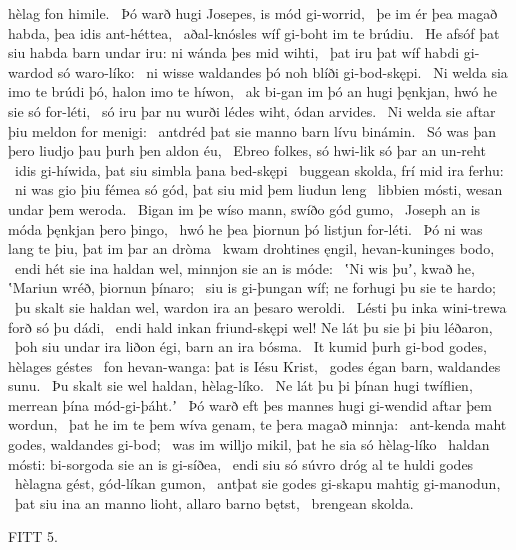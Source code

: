 hèlag fon himile. \hld\ Þó warð hugi Josepes,
is mód gi-worrid, \hld\ þe im ér þea magað habda,
þea idis ant-héttea, \hld\ aðal-knósles wíf
gi-boht im te brúdiu. \hld\ He afsóf þat siu habda barn undar iru:
ni wánda þes mid wihti, \hld\ þat iru þat wíf habdi
gi-wardod só waro-líko: \hld\ ni wisse waldandes þó noh
blíði gi-bod-skępi. \hld\ Ni welda sia imo te brúdi þó,
halon imo te híwon, \hld\ ak bi-gan im þó an hugi þęnkjan,
hwó he sie só for-léti, \hld\ só iru þar nu wurði lédes wiht,
ódan arvides. \hld\ Ni welda sie aftar þiu
meldon for menigi: \hld\ antdréd þat sie manno barn
lívu binámin. \hld\ Só was þan þero liudjo þau
þurh þen aldon éu, \hld\ Ebreo folkes,
só hwi-lik só þar an un-reht \hld\ idis gi-híwida,
þat siu simbla þana bed-skępi \hld\ buggean skolda,
frí mid ira ferhu: \hld\ ni was gio þiu fémea só gód,
þat siu mid þem liudun leng \hld\ libbien mósti,
wesan undar þem weroda. \hld\ Bigan im þe wíso mann,
swíðo gód gumo, \hld\ Joseph an is móda
þęnkjan þero þingo, \hld\ hwó he þea þiornun þó
listjun for-léti. \hld\ Þó ni was lang te þiu,
þat im þar an dròma \hld\ kwam drohtines ęngil,
hevan-kuninges bodo, \hld\ endi hét sie ina haldan wel,
minnjon sie an is móde: \hld\ ʽNi wis þuʼ, kwað he, ʽMariun wréð,
þiornun þínaro; \hld\ siu is gi-þungan wíf;
ne forhugi þu sie te hardo; \hld\ þu skalt sie haldan wel,
wardon ira an þesaro weroldi. \hld\ Lésti þu inka wini-trewa
forð só þu dádi, \hld\ endi hald inkan friund-skępi wel!
Ne lát þu sie þi þiu léðaron, \hld\ þoh siu undar ira liðon égi,
barn an ira bósma. \hld\ It kumid þurh gi-bod godes,
hèlages géstes \hld\ fon hevan-wanga:
þat is Iésu Krist, \hld\ godes égan barn,
waldandes sunu. \hld\ Þu skalt sie wel haldan,
hèlag-líko. \hld\ Ne lát þu þi þínan hugi twíflien,
merrean þína mód-gi-þáht.ʼ \hld\ Þó warð eft þes mannes hugi
gi-wendid aftar þem wordun, \hld\ þat he im te þem wíva genam,
te þera magað minnja: \hld\ ant-kenda maht godes,
waldandes gi-bod; \hld\ was im willjo mikil,
þat he sia só hèlag-líko \hld\ haldan mósti:
bi-sorgoda sie an is gi-síðea, \hld\ endi siu só súvro dróg
al te huldi godes \hld\ hèlagna gést,
gód-líkan gumon, \hld\ antþat sie godes gi-skapu
mahtig gi-manodun, \hld\ þat siu ina an manno lioht,
allaro barno bętst, \hld\ brengean skolda.

FITT 5.

